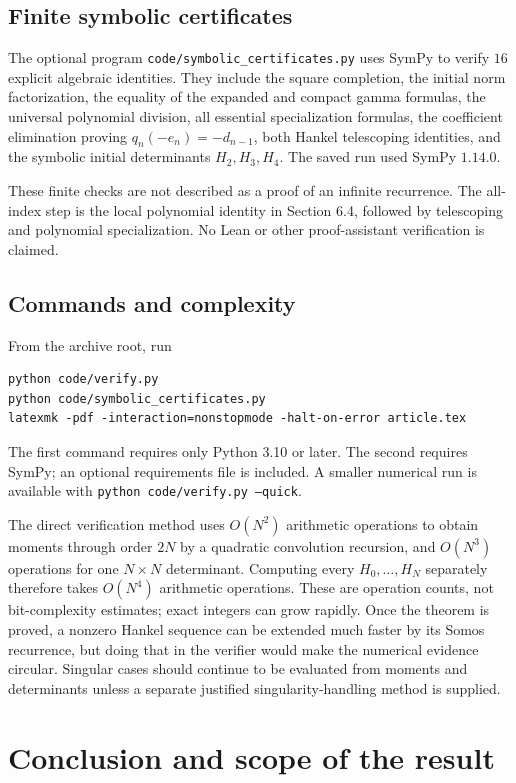 \documentclass[11pt,a4paper]{article}
\numberwithin{equation}{section}
\theoremstyle{definition}
\begin{document}
\subsection{Finite symbolic certificates}
The optional program \texttt{code/symbolic\_certificates.py} uses SymPy to
verify $16$ explicit algebraic identities. They include the square
completion, the initial norm factorization, the equality of the expanded
and compact gamma formulas, the universal polynomial division, all essential
specialization formulas, the coefficient elimination proving
$q_n(-e_n)=-d_{n-1}$, both Hankel telescoping identities, and the symbolic
initial determinants $H_2,H_3,H_4$. The saved run used SymPy $1.14.0$.

These finite checks are not described as a proof of an infinite recurrence.
The all-index step is the local polynomial identity in Section 6.4, followed
by telescoping and polynomial specialization. No Lean or other proof-assistant
verification is claimed.

\subsection{Commands and complexity}
From the archive root, run
\begin{lstlisting}
python code/verify.py
python code/symbolic_certificates.py
latexmk -pdf -interaction=nonstopmode -halt-on-error article.tex
\end{lstlisting}
The first command requires only Python 3.10 or later. The second requires
SymPy; an optional requirements file is included. A smaller numerical run is
available with \texttt{python code/verify.py --quick}.

The direct verification method uses $O(N^2)$ arithmetic operations to obtain
moments through order $2N$ by a quadratic convolution recursion, and
$O(N^3)$ operations for one $N\times N$ determinant. Computing every
$H_0,\ldots,H_N$ separately therefore takes $O(N^4)$ arithmetic operations.
These are operation counts, not bit-complexity estimates; exact integers can
grow rapidly. Once the theorem is proved, a nonzero Hankel sequence can be
extended much faster by its Somos recurrence, but doing that in the verifier
would make the numerical evidence circular. Singular cases should continue
to be evaluated from moments and determinants unless a separate justified
singularity-handling method is supplied.

\section{Conclusion and scope of the result}
\end{document}
